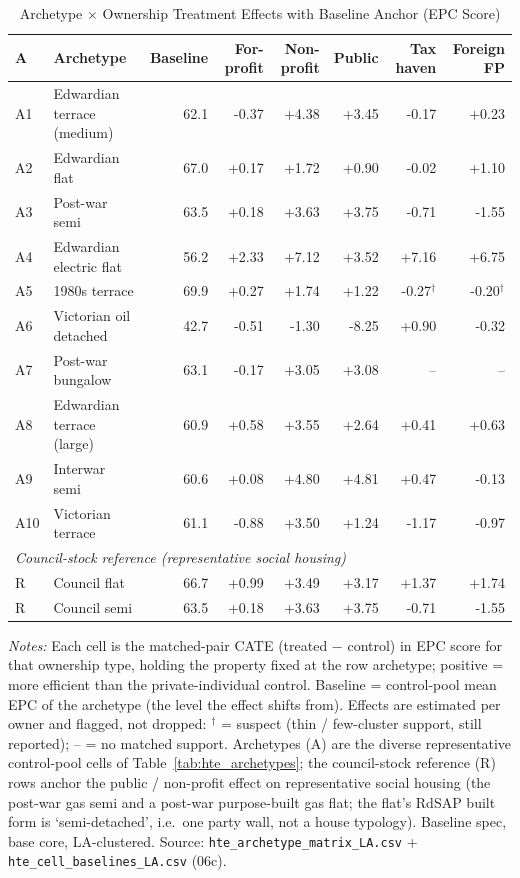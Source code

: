 \begin{table}[htbp]
\centering
\caption{Archetype $\times$ Ownership Treatment Effects with Baseline Anchor (EPC Score)}
\label{tab:hte_archetype_matrix}
\scriptsize
\begin{tabular}{llrrrrrr}
\toprule
A & Archetype & Baseline & For-profit & Non-profit & Public & Tax haven & Foreign FP \\
\midrule
A1 & Edwardian terrace (medium) & 62.1 & -0.37 & +4.38 & +3.45 & -0.17 & +0.23 \\
A2 & Edwardian flat & 67.0 & +0.17 & +1.72 & +0.90 & -0.02 & +1.10 \\
A3 & Post-war semi & 63.5 & +0.18 & +3.63 & +3.75 & -0.71 & -1.55 \\
A4 & Edwardian electric flat & 56.2 & +2.33 & +7.12 & +3.52 & +7.16 & +6.75 \\
A5 & 1980s terrace & 69.9 & +0.27 & +1.74 & +1.22 & -0.27$^{\dagger}$ & -0.20$^{\dagger}$ \\
A6 & Victorian oil detached & 42.7 & -0.51 & -1.30 & -8.25 & +0.90 & -0.32 \\
A7 & Post-war bungalow & 63.1 & -0.17 & +3.05 & +3.08 & -- & -- \\
A8 & Edwardian terrace (large) & 60.9 & +0.58 & +3.55 & +2.64 & +0.41 & +0.63 \\
A9 & Interwar semi & 60.6 & +0.08 & +4.80 & +4.81 & +0.47 & -0.13 \\
A10 & Victorian terrace & 61.1 & -0.88 & +3.50 & +1.24 & -1.17 & -0.97 \\
\midrule
\multicolumn{8}{l}{\textit{Council-stock reference (representative social housing)}} \\
R & Council flat & 66.7 & +0.99 & +3.49 & +3.17 & +1.37 & +1.74 \\
R & Council semi & 63.5 & +0.18 & +3.63 & +3.75 & -0.71 & -1.55 \\
\bottomrule
\end{tabular}
\begin{minipage}{0.95\textwidth}
\vspace{4pt}
\footnotesize
\textit{Notes:} Each cell is the matched-pair CATE (treated $-$ control) in EPC
score for that ownership type, holding the property fixed at the row archetype;
positive = more efficient than the private-individual control. Baseline = control-pool
mean EPC of the archetype (the level the effect shifts from). Effects are estimated
per owner and flagged, not dropped: $^{\dagger}$ = suspect (thin / few-cluster support,
still reported); -- = no matched support. Archetypes (A) are the diverse representative
control-pool cells of Table~\ref{tab:hte_archetypes}; the council-stock reference (R)
rows anchor the public / non-profit effect on representative social housing (the
post-war gas semi and a post-war purpose-built gas flat; the flat's RdSAP built form
is `semi-detached', i.e.\ one party wall, not a house typology). Baseline spec, base
core, LA-clustered. Source: \texttt{hte\_archetype\_matrix\_LA.csv} + \texttt{hte\_cell\_baselines\_LA.csv} (06c).
\end{minipage}
\end{table}
